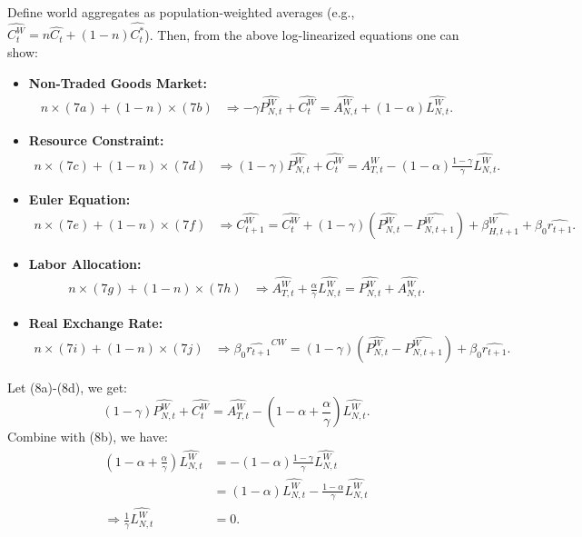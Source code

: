 \documentclass[a4paper,12pt]{article} %
\theoremstyle{nonitalic}
\begin{document}
Define world aggregates as population-weighted averages (e.g., $  \widehat{C_t^W} = n \widehat{C_t} + (1-n) \widehat{C_t^*}$).
Then, from the above log-linearized equations one can show:
\begin{itemize}
    \item \textbf{Non-Traded Goods Market:}
    \begin{align*}
        n \times (7a) + (1-n) \times (7b) &\Rightarrow -\gamma  \widehat{P_{N,t}^W} +  \widehat{C_t^W} =  \widehat{A_{N,t}^W} + (1-\alpha)  \widehat{L_{N,t}^W} \tag{8a}.
    \end{align*}
    \item \textbf{Resource Constraint:}
    \begin{align*}
        n \times (7c) + (1-n) \times (7d) &\Rightarrow (1-\gamma)  \widehat{P_{N,t}^W} +  \widehat{C_t^W} =  \widehat{A_{T,t}^W} - (1-\alpha) \frac{1-\gamma}{\gamma}  \widehat{L_{N,t}^W} \tag{8b}.
    \end{align*}
    \item \textbf{Euler Equation:}
    \begin{align*}
        n \times (7e) + (1-n) \times (7f) &\Rightarrow  \widehat{C_{t+1}^W} =  \widehat{C_t^W} + (1-\gamma) ( \widehat{P_{N,t}^W} -  \widehat{P_{N,t+1}^W}) +  \widehat{\beta_{H,t+1}^W} + \beta_0 \widehat{r_{t+1}} \tag{8c}.
    \end{align*}
    \item \textbf{Labor Allocation:}
    \begin{align*}
        n \times (7g) + (1-n) \times (7h) &\Rightarrow  \widehat{A_{T,t}^W} + \frac{\alpha}{\gamma}  \widehat{L_{N,t}^W} =  \widehat{P_{N,t}^W} +  \widehat{A_{N,t}^W} \tag{8d}.
    \end{align*}
    \item \textbf{Real Exchange Rate:}
    \begin{align*}
        n \times (7i) + (1-n) \times (7j) &\Rightarrow \beta_0  \widehat{r_{t+1}}^{C W} = (1-\gamma) ( \widehat{P_{N,t}^W} -  \widehat{P_{N,t+1}^W}) + \beta_0  \widehat{r_{t+1}} \tag{8e}.
    \end{align*}
\end{itemize}
Let (8a)-(8d), we get:
\[
(1-\gamma)  \widehat{P_{N,t}^W} +  \widehat{C_t^W} =  \widehat{A_{T,t}^W} - (1-\alpha + \frac{\alpha}{\gamma})  \widehat{L_{N,t}^W}.
\]
Combine with (8b), we have:
\begin{align*}
    (1 - \alpha + \frac{\alpha}{\gamma})  \widehat{L_{N,t}^W} &= -(1-\alpha) \frac{1-\gamma}{\gamma}  \widehat{L_{N,t}^W} \\
    &= (1-\alpha)  \widehat{L_{N,t}^W} - \frac{1-\alpha}{\gamma}  \widehat{L_{N,t}^W} \\
    \Rightarrow \frac{1}{\gamma}  \widehat{L_{N,t}^W} &= 0.
\end{align*}
\end{document}
